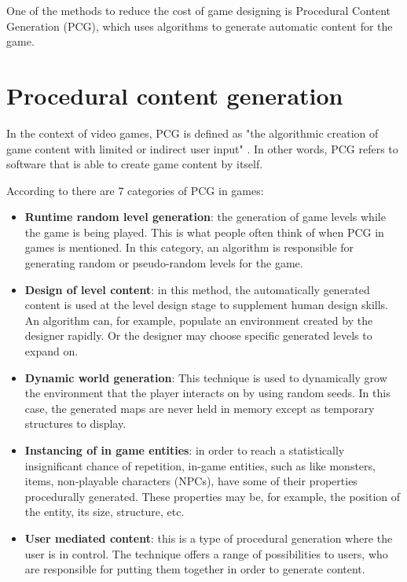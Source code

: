 One of the methods to reduce the cost of game designing is Procedural Content Generation (PCG), which uses algorithms to generate automatic content for the game.

\section{Procedural content generation}
\label{sec:pcg}

In the context of video games, PCG is defined as "the algorithmic creation of game content with
limited or indirect user input" \cite{togelius:2011}. In other words, PCG refers to software that is able to create game content by itself.

According to \textcite{doull:2008} there are 7 categories of PCG in games:

\begin{itemize}
\item \textbf{Runtime random level generation}: the generation of game levels while the game is being played. This is what people often think of when PCG in games is mentioned. In this category, an algorithm is responsible for generating random or pseudo-random levels for the game.

\item \textbf{Design of level content}: in this method, the automatically generated content is used at the level design stage to supplement human design skills. An algorithm can, for example, populate an environment created by the designer rapidly. Or the designer may choose specific generated levels to expand on.

\item \textbf{Dynamic world generation}: This technique is used to dynamically grow the environment that the player interacts on by using random seeds. In this case, the generated maps are never held in memory except as temporary structures to display.

\item \textbf{Instancing of in game entities}: in order to reach a statistically insignificant chance of repetition, in-game entities, such as like monsters, items, non-playable characters (NPCs), have some of their properties procedurally generated. These properties may be, for example, the position of the entity, its size, structure, etc.

\item \textbf{User mediated content}: this is a type of procedural generation where the user is in control. The technique offers a range of possibilities to users, who are responsible for putting them together in order to generate content.


\end{itemize}
